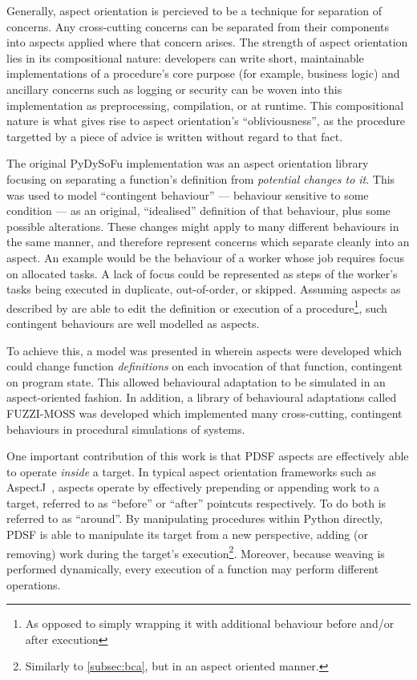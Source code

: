 Generally, aspect orientation is percieved to be a technique for separation of
concerns. Any cross-cutting concerns can be separated from their components into
aspects applied where that concern arises. The strength of aspect orientation
lies in its compositional nature: developers can write short, maintainable
implementations of a procedure's core purpose (for example, business logic) and
ancillary concerns such as logging or security can be woven into this
implementation as preprocessing, compilation, or at runtime. This compositional
nature is what gives rise to aspect orientation's ``obliviousness'', as the
procedure targetted by a piece of advice is written without regard to that fact.

The original PyDySoFu implementation was an aspect orientation library focusing
on separating a function's definition from \emph{potential changes to it}. This
was used to model ``contingent behaviour'' --- behaviour sensitive to some
condition --- as an original, ``idealised'' definition of that behaviour, plus
some possible alterations. These changes might apply to many different
behaviours in the same manner, and therefore represent concerns which separate
cleanly into an aspect. An example would be the behaviour of a worker whose job
requires focus on allocated tasks. A lack of focus could be represented as steps
of the worker's tasks being executed in duplicate, out-of-order, or skipped.
Assuming aspects as described by \citeauthor{kiczales1997aspect} are able to
edit the definition or execution of a procedure\footnote{As opposed to simply
wrapping it with additional behaviour before and/or after execution}, such
contingent behaviours are well modelled as aspects.

To achieve this, a model was presented in \cite{wallis2018caise} wherein aspects
were developed which could change function \emph{definitions} on each invocation
of that function, contingent on program state. This allowed behavioural
adaptation to be simulated in an aspect-oriented fashion. In addition, a library
of behavioural adaptations called FUZZI-MOSS was developed
which implemented many cross-cutting, contingent behaviours in procedural
simulations of \sociotechnical systems.

One important contribution of this work is that PDSF aspects are effectively
able to operate \emph{inside} a target. In typical aspect orientation frameworks
such as AspectJ~\cite{aspectj_intro}, aspects operate by effectively prepending
or appending work to a target, referred to as ``before'' or ``after'' pointcuts
respectively. To do both is referred to as ``around''. By manipulating
procedures within Python directly, PDSF is able to manipulate its target from a
new perspective, adding (or removing) work during the target's
execution\footnote{Similarly to \cref{subsec:bca}, but in an aspect oriented
manner.}. Moreover, because weaving is performed dynamically, every execution of
a function may perform different operations.

